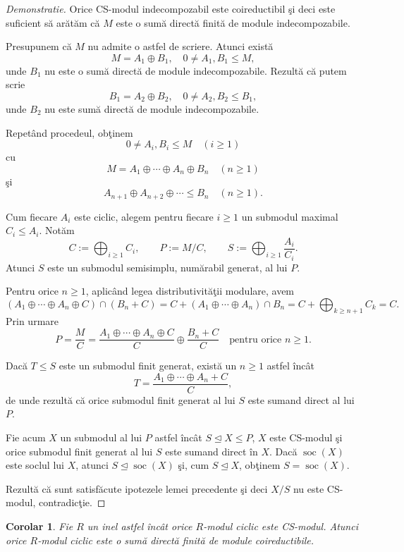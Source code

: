 \documentclass[12pt,a4paper]{book}
\newcommand{\ess}{\trianglelefteq}  %
\theoremstyle{plain}
\newtheorem{corollary}[theorem]{Corolar}
\theoremstyle{definition}
\theoremstyle{remark}
\begin{document}
\begin{proof}[Demonstratie]
Orice CS-modul indecompozabil este coireductibil şi deci este suficient
să arătăm că \(M\) este o sumă directă finită de module indecompozabile.

Presupunem că \(M\) nu admite o astfel de scriere.
Atunci există
\[
M = A_1 \oplus B_1,
\quad
0 \neq A_1, B_1 \leq M,
\]
unde \(B_1\) nu este o sumă directă de module indecompozabile.
Rezultă că putem scrie
\[
B_1 = A_2 \oplus B_2,
\quad
0 \neq A_2, B_2 \leq B_1,
\]
unde \(B_2\) nu este sumă directă de module indecompozabile.

Repetând procedeul, obţinem
\[
0 \neq A_i, B_i \leq M \quad (i \geq 1)
\]
cu
\[
M = A_1 \oplus \cdots \oplus A_n \oplus B_n
\quad (n \geq 1)
\]
şi
\[
A_{n+1} \oplus A_{n+2} \oplus \cdots \leq B_n
\quad (n \geq 1).
\]

Cum fiecare \(A_i\) este ciclic, alegem pentru fiecare \(i \geq 1\)
un submodul maximal \(C_i \leq A_i\).
Notăm
\[
C := \bigoplus_{i \geq 1} C_i,
\qquad
P := M/C,
\qquad
S := \bigoplus_{i \geq 1} \frac{A_i}{C_i}.
\]
Atunci \(S\) este un submodul semisimplu, numărabil generat, al lui \(P\).

Pentru orice \(n \geq 1\), aplicând legea distributivităţii modulare, avem
\[
(A_1 \oplus \cdots \oplus A_n \oplus C)
  \cap (B_n + C)
 = C + (A_1 \oplus \cdots \oplus A_n) \cap B_n
 = C + \bigoplus_{k \geq n+1} C_k
 = C.
\]
Prin urmare
\[
P = \frac{M}{C}
  = \frac{A_1 \oplus \cdots \oplus A_n \oplus C}{C}
    \oplus \frac{B_n + C}{C}
  \quad \text{pentru orice } n \geq 1.
\]

Dacă \(T \leq S\) este un submodul finit generat, există un
\(n \geq 1\) astfel încât
\[
T = \frac{A_1 \oplus \cdots \oplus A_n + C}{C},
\]
de unde rezultă că orice submodul finit generat al lui \(S\)
este sumand direct al lui \(P\).

Fie acum \(X\) un submodul al lui \(P\) astfel încât
\(S \ess X \leq P\), \(X\) este CS-modul şi
orice submodul finit generat al lui \(S\) este sumand direct în \(X\).
Dacă \(\operatorname{soc}(X)\) este soclul lui \(X\),
atunci \(S \ess \operatorname{soc}(X)\) şi, cum \(S \ess X\),
obţinem \(S = \operatorname{soc}(X)\).

Rezultă că sunt satisfăcute ipotezele lemei precedente
şi deci \(X/S\) nu este CS-modul, contradicţie.
\end{proof}

\begin{corollary}
Fie \(R\) un inel astfel încât orice \(R\)-modul ciclic este CS-modul.
Atunci orice \(R\)-modul ciclic este o sumă directă finită de module
coireductibile.
\end{corollary}
\end{document}
